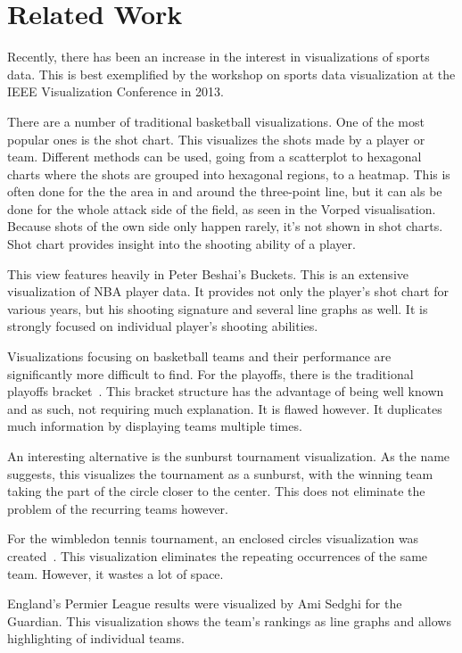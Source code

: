 \documentclass[]{sigchi}
\begin{document}
\section{Related Work}\label{sec:literature}
Recently, there has been an increase in the interest in visualizations of sports
data. This is best exemplified by the workshop on sports data visualization at
the IEEE Visualization Conference in 2013\cite{ieeevis}. 

There are a number of traditional basketball visualizations. One of the most
popular ones is the shot chart. This visualizes the shots made by a player or team. Different methods can be used, going from a scatterplot to hexagonal charts where the shots are grouped into hexagonal regions, to a heatmap. This is often done for the the area in and around the three-point line, but it can als be done for the whole attack side of the field, as seen in the Vorped visualisation\cite{vorped}. Because shots of the own side only happen rarely, it's not shown in shot charts. Shot chart provides insight into the shooting ability of a
player\cite{goldsberry,stephenchu}.

This view features heavily in Peter Beshai's Buckets\cite{peterbeshai}. This is
an extensive visualization of NBA player data. It provides not only the player's
shot chart for various years, but his shooting signature and several line graphs
as well. It is strongly focused on individual player's shooting abilities. 

Visualizations focusing on basketball teams and their performance are
significantly more difficult to find. For the playoffs, there is the traditional
playoffs bracket~\cite{tournamentladder}. This bracket structure has the
advantage of being well known and as such, not requiring much explanation. It is
flawed however. It duplicates much information by displaying teams multiple
times. 

An interesting alternative is the sunburst tournament
visualization\cite{sunburst}. As the name suggests, this visualizes the
tournament as a sunburst, with the winning team taking the part of the circle
closer to the center. This does not eliminate the problem of the recurring teams
however.

For the wimbledon tennis tournament, an enclosed circles visualization was
created~\cite{enclosedcircles}. This visualization eliminates the repeating
occurrences of the same team. However, it wastes a lot of space. 

England's Permier League results were visualized by Ami Sedghi for the
Guardian\cite{premierleague}. This visualization shows the team's rankings as
line graphs and allows highlighting of individual teams.
\end{document}
